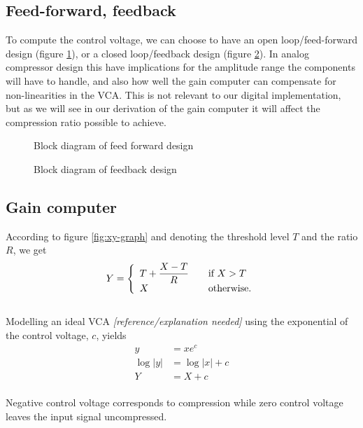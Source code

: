 \documentclass[]{article}
\begin{document}
\subsection{Feed-forward, feedback}
To compute the control voltage, we can choose to have an open loop/feed-forward design (figure \ref{fig:feedforward-blockdiagram}), or a closed loop/feedback design (figure \ref{fig:feedback-blockdiagram}). In analog compressor design this have implications for the amplitude range the components will have to handle, and also how well the gain computer can compensate for non-linearities in the VCA. This is not relevant to our digital implementation, but as we will see in our derivation of the gain computer it will affect the compression ratio possible to achieve.

\begin{figure}[ht]
\centering

\caption{Block diagram of feed forward design}
\label{fig:feedforward-blockdiagram}
\end{figure}

\begin{figure}[ht]
\centering

\caption{Block diagram of feedback design} 
\label{fig:feedback-blockdiagram}
\end{figure}

\subsection{Gain computer}
According to figure \ref{fig:xy-graph} and denoting the threshold level $T$ and the ratio $R$, we get
\begin{equation} \label{eq:gaincomp}
Y = \left\{ 
  \begin{array}{l l}
    T+ \dfrac{X-T}{R} & \quad \text{if $X > T$}\\
    X & \quad \text{otherwise.}
  \end{array} \right.
\end{equation}
\\Modelling an ideal VCA \emph{[reference/explanation needed]} using the exponential of the control voltage, $c$, yields
\begin{align}
y &= xe^{c}   \\
\log|y| & = \log|x| + c   \\
Y &= X + c \label{eq:cv}
\end{align}
\\Negative control voltage corresponds to compression while zero control voltage leaves the input signal uncompressed. 
\end{document}
